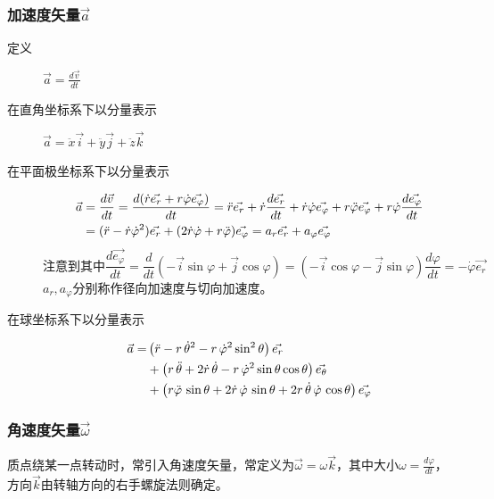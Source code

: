 \subsubsection{加速度矢量$\vec{a}$}\begin{description}
\item[定义]$\vec{a}=\frac{d\vec{v}}{dt}$
\item[在直角坐标系下以分量表示]$\vec{a}=\ddot{x}\vec{i}+\ddot{y}\vec{j}+\ddot{z}\vec{k}$
\item[在平面极坐标系下以分量表示]
\begin{align}
\vec{a} &= \frac{d\vec{v}}{dt} =\frac{d(\dot{r}\vec{e_r}+r\dot{\varphi}\vec{e_\varphi})}{dt} =\ddot{r}\vec{e_r}+\dot{r}\frac{d\vec{e_r}}{dt}+\dot{r}\dot{\varphi}\vec{e_\varphi}+r\ddot{\varphi}\vec{e_\varphi}+r\dot{\varphi}\frac{d\vec{e_\varphi}}{dt} \notag \\
&=(\ddot{r}-\dot{r}\dot{\varphi}^2) \vec{e_r}+(2\dot{r}\dot{\varphi}+r\ddot{\varphi})\vec{e_\varphi} = a_r\vec{e_r}+a_\varphi\vec{e_\varphi} \notag
\end{align}
\[\text{注意到其中}\frac{d\vec{e_\varphi}}{dt} = \frac{d}{dt} (-\vec{i}\sin\varphi+\vec{j}\cos\varphi) = (-\vec{i}\cos\varphi-\vec{j}\sin\varphi)\frac{d\varphi}{dt}=-\dot\varphi\vec{e_r}\]
$a_r,a_\varphi$分别称作径向加速度与切向加速度。
\item[在球坐标系下以分量表示]
\begin{align}
\vec{a} = & \left( \ddot{r} - r\,\dot\theta^2 - r\,\dot\varphi^2\sin^2\theta \right)\vec{e_r} \notag \\
&+\left( r\,\ddot\theta + 2\dot{r}\,\dot\theta - r\,\dot\varphi^2\sin\theta\cos\theta \right) \vec{e_\theta} \notag \\
&+\left( r\ddot\varphi\,\sin\theta + 2\dot{r}\,\dot\varphi\,\sin\theta + 2 r\,\dot\theta\,\dot\varphi\,\cos\theta \right) \vec{e_\varphi}   \notag
\end{align}
\end{description}

\subsubsection{角速度矢量$\vec{\omega}$}
质点绕某一点转动时，常引入角速度矢量，常定义为$\vec{\omega}=\omega\vec{k}$，其中大小$\omega=\frac{d\varphi}{dt}$，方向$\vec{k}$由转轴方向的右手螺旋法则确定。

